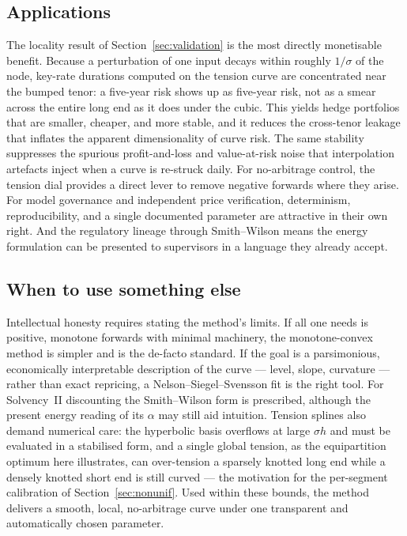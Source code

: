\documentclass[]{interact}
\theoremstyle{plain}
\begin{document}
\subsection{Applications}
The locality result of Section~\ref{sec:validation} is the most directly monetisable benefit.
Because a perturbation of one input decays within roughly $1/\sigma$ of the node, key-rate
durations computed on the tension curve are concentrated near the bumped tenor: a five-year
risk shows up as five-year risk, not as a smear across the entire long end as it does under the
cubic. This yields hedge portfolios that are smaller, cheaper, and more stable, and it reduces
the cross-tenor leakage that inflates the apparent dimensionality of curve risk. The same
stability suppresses the spurious profit-and-loss and value-at-risk noise that interpolation
artefacts inject when a curve is re-struck daily. For no-arbitrage control, the tension dial
provides a direct lever to remove negative forwards where they arise. For model governance and
independent price verification, determinism, reproducibility, and a single documented parameter
are attractive in their own right. And the regulatory lineage through Smith--Wilson means the
energy formulation can be presented to supervisors in a language they already accept.

\subsection{When to use something else}
Intellectual honesty requires stating the method's limits. If all one needs is positive,
monotone forwards with minimal machinery, the monotone-convex method is simpler and is the
de-facto standard. If the goal is a parsimonious, economically interpretable description of the
curve --- level, slope, curvature --- rather than exact repricing, a Nelson--Siegel--Svensson
fit is the right tool. For Solvency~II discounting the Smith--Wilson form is prescribed,
although the present energy reading of its $\alpha$ may still aid intuition. Tension splines
also demand numerical care: the hyperbolic basis overflows at large $\sigma h$ and must be
evaluated in a stabilised form, and a single global tension, as the equipartition optimum here
illustrates, can over-tension a sparsely knotted long end while a densely knotted short end is
still curved --- the motivation for the per-segment calibration of Section~\ref{sec:nonunif}. Used within these
bounds, the method delivers a smooth, local, no-arbitrage curve under one transparent and
automatically chosen parameter.
\end{document}
